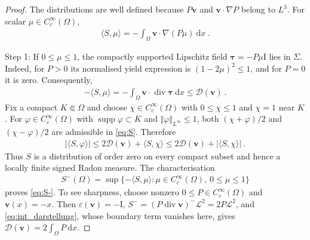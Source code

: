\documentclass{article}
\theoremstyle{definition}
\newcommand{\bfv}{\boldsymbol{v}}
\newcommand{\bftau}{\boldsymbol{\tau}}
\newcommand{\bfI}{\boldsymbol{\mathrm{I}}}
\newcommand{\D}{\mathcal{D}}
\newcommand{\dd}{\:\mathrm{d}}
\renewcommand\div{\operatorname{\mathrm{div}}}
\DeclareMathOperator{\supp}{supp}
\begin{document}
\begin{proof}
    The distributions are well defined because $P\bfv$ and
    $\bfv\cdot\nabla P$ belong to $L^3$. For scalar
    $\mu\in C_c^\infty(\Omega)$,
    \begin{align}
        \langle S,\mu\rangle
        =-\int_\Omega\bfv\cdot\nabla(P\mu)\dd x \ .
        \label{eq:ip_measure}
    \end{align}

    Step 1: If $0\leq\mu\leq1$, the compactly supported Lipschitz field
    $\bftau=-P\mu\bfI$ lies in $\Sigma$. Indeed, for $P>0$ its normalised
    yield expression is $(1-2\mu)^2\leq1$, and for $P=0$ it is zero.
    Consequently,
    \begin{align}
        -\langle S,\mu\rangle
        =-\int_\Omega\bfv\cdot\div\bftau\dd x\leq\D(\bfv) \ .
        \label{eq:S}
    \end{align}
    Fix a compact $K\Subset\Omega$ and choose
    $\chi\in C_c^\infty(\Omega)$ with $0\leq\chi\leq1$ and $\chi=1$
    near $K$. For $\varphi\in C_c^\infty(\Omega)$ with
    $\supp\varphi\subset K$ and $\Vert\varphi\Vert_{L^\infty}\leq1$, both
    $(\chi+\varphi)/2$ and $(\chi-\varphi)/2$ are admissible in
    \eqref{eq:S}. Therefore
    \begin{align*}
        |\langle S,\varphi\rangle|
        \leq2\D(\bfv)+\langle S,\chi\rangle
        \leq2\D(\bfv)+|\langle S,\chi\rangle| \ .
    \end{align*}
    Thus $S$ is a distribution of order zero on every compact subset and
    hence a locally finite signed Radon measure. The characterisation
    \begin{align*}
        S^-(\Omega)=\sup\{-\langle S,\mu\rangle:
        \mu\in C_c^\infty(\Omega),\ 0\leq\mu\leq1\}
    \end{align*}
    proves \eqref{eq:S-}. To see sharpness, choose nonzero
    $0\leq P\in C_c^\infty(\Omega)$ and $\bfv(x)=-x$. Then
    $\varepsilon(\bfv)=-\bfI$, $S^-=(P\div\bfv)^-\mathcal{L}^2
    =2P\mathcal{L}^2$, and \eqref{eq:int_darstellung}, whose boundary term
    vanishes here, gives $\D(\bfv)=2\int_\Omega P\dd x$.


\end{proof}
\end{document}
